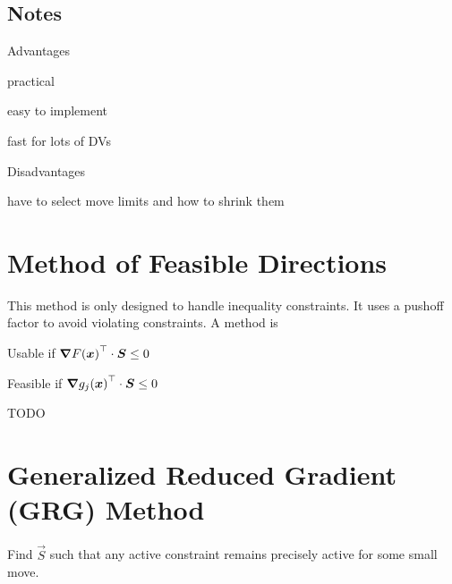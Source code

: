\documentclass{article}
\begin{document}
\subsection*{Notes}

\begin{itemize*}
\item Advantages
  \begin{itemize*}
  \item practical
  \item easy to implement
  \item fast for lots of DVs
  \end{itemize*}
\item Disadvantages
  \begin{itemize*}
  \item have to select move limits and how to shrink them
  \end{itemize*}
\end{itemize*}

\section{Method of Feasible Directions}

This method is only designed to handle inequality constraints. It uses a pushoff factor to avoid violating constraints. A method is
\begin{description*}
\item[Usable if] \({{\bm{\nabla} F(\bm{x})}^\top} \cdot \bm{S} \le 0\)
\item[Feasible if] \({{\bm{\nabla} g_j(\bm{x})}^\top} \cdot \bm{S} \le 0\)
\end{description*}

TODO

\section{Generalized Reduced Gradient (GRG) Method}

Find \(\vec{S}\) such that any active constraint remains precisely active for some small move.
\end{document}
